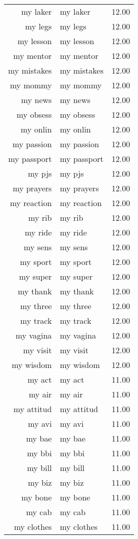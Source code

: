 \begin{table}[ht]
\begin{tabular}{rlr}
  my laker & my laker & 12.00 \\ 
  my legs & my legs & 12.00 \\ 
  my lesson & my lesson & 12.00 \\ 
  my mentor & my mentor & 12.00 \\ 
  my mistakes & my mistakes & 12.00 \\ 
  my mommy & my mommy & 12.00 \\ 
  my news & my news & 12.00 \\ 
  my obsess & my obsess & 12.00 \\ 
  my onlin & my onlin & 12.00 \\ 
  my passion & my passion & 12.00 \\ 
  my passport & my passport & 12.00 \\ 
  my pjs & my pjs & 12.00 \\ 
  my prayers & my prayers & 12.00 \\ 
  my reaction & my reaction & 12.00 \\ 
  my rib & my rib & 12.00 \\ 
  my ride & my ride & 12.00 \\ 
  my sens & my sens & 12.00 \\ 
  my sport & my sport & 12.00 \\ 
  my super & my super & 12.00 \\ 
  my thank & my thank & 12.00 \\ 
  my three & my three & 12.00 \\ 
  my track & my track & 12.00 \\ 
  my vagina & my vagina & 12.00 \\ 
  my visit & my visit & 12.00 \\ 
  my wisdom & my wisdom & 12.00 \\ 
  my act & my act & 11.00 \\ 
  my air & my air & 11.00 \\ 
  my attitud & my attitud & 11.00 \\ 
  my avi & my avi & 11.00 \\ 
  my bae & my bae & 11.00 \\ 
  my bbi & my bbi & 11.00 \\ 
  my bill & my bill & 11.00 \\ 
  my biz & my biz & 11.00 \\ 
  my bone & my bone & 11.00 \\ 
  my cab & my cab & 11.00 \\ 
  my clothes & my clothes & 11.00 \\ 

\end{tabular}
\end{table}
